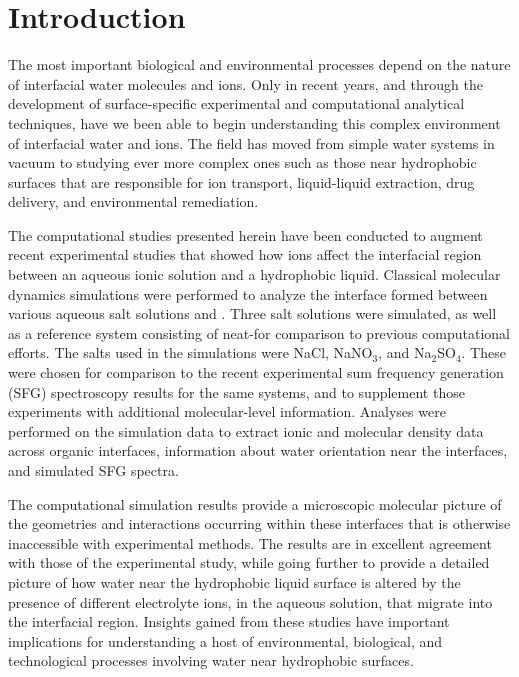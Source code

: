 \section{Introduction}

The most important biological and environmental processes depend on the nature of interfacial water molecules and ions. Only in recent years, and through the development of surface-specific experimental\cite{Charreteur2008,Chen2007,Luo2006,McArthur2006} and computational\cite{Schnell2004,Su2005,Wardle2005,Wick2008a} analytical techniques, have we been able to begin understanding this complex environment of interfacial water and ions. The field has moved from simple water systems in vacuum to studying ever more complex ones such as those near hydrophobic surfaces that are responsible for ion transport, liquid-liquid extraction, drug delivery, and environmental remediation. 

The computational studies presented herein have been conducted to augment recent experimental studies that showed how ions affect the interfacial region between an aqueous ionic solution and a hydrophobic liquid.\cite{McFearin2009} Classical molecular dynamics simulations were performed to analyze the interface formed between various aqueous salt solutions and \ctc. Three salt solutions were simulated, as well as a reference system consisting of neat-\wat for comparison to previous computational efforts.\cite{Hore2007,Hore2008,Hore2007a,Walker2006b,Walker2007a,Walker2007b} The salts used in the simulations were NaCl, NaNO$_3$, and Na$_2$SO$_4$. These were chosen for comparison to the recent experimental sum frequency generation (SFG) spectroscopy results for the same systems,\cite{McFearin2009} and to supplement those experiments with additional molecular-level information. Analyses were performed on the simulation data to extract ionic and molecular density data across organic interfaces, information about water orientation near the interfaces, and simulated SFG spectra. 


The computational simulation results provide a microscopic molecular picture of the geometries and interactions occurring within these interfaces that is otherwise inaccessible with experimental methods. The results are in excellent agreement with those of the experimental study, while going further to provide a detailed picture of how water near the hydrophobic liquid surface is altered by the presence of different electrolyte ions, in the aqueous solution, that migrate into the interfacial region. Insights gained from these studies have important implications for understanding a host of environmental, biological, and technological processes involving water near hydrophobic surfaces.

